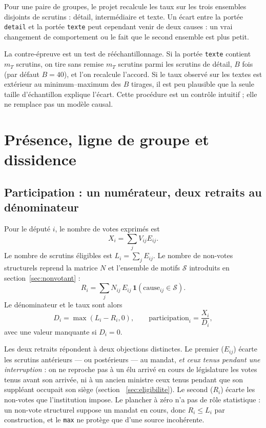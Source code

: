 \documentclass[11pt,a4paper]{article}
\newcommand{\ind}{\mathbf{1}}
\newcommand{\code}[1]{\texttt{#1}}
\begin{document}
Pour une paire de groupes, le projet recalcule les taux sur les trois ensembles
disjoints de scrutins : détail, intermédiaire et texte. Un écart entre la portée
\code{detail} et la portée \code{texte} peut cependant venir de deux causes :
un vrai changement de comportement ou le fait que le second ensemble est plus
petit.

La contre-épreuve est un test de rééchantillonnage. Si la portée \code{texte}
contient $m_T$ scrutins, on tire sans remise $m_T$ scrutins parmi les scrutins de
détail, $B$ fois (par défaut $B=40$), et l'on recalcule l'accord. Si le taux
observé sur les textes est extérieur au minimum--maximum des $B$ tirages, il est
peu plausible que la seule taille d'échantillon explique l'écart. Cette procédure
est un contrôle intuitif ; elle ne remplace pas un modèle causal.

\section{Présence, ligne de groupe et dissidence}

\subsection{Participation : un numérateur, deux retraits au dénominateur}
\label{sec:participation}

Pour le député $i$, le nombre de votes exprimés est
\[
 X_i=\sum_j V_{ij}E_{ij}.
\]
Le nombre de scrutins éligibles est $L_i=\sum_jE_{ij}$. Le nombre de non-votes
structurels reprend la matrice $N$ et l'ensemble de motifs $\mathcal S$
introduits en section~\ref{sec:nonvotant} :
\[
 R_i=\sum_j N_{ij}\,E_{ij}\,
 \ind\!\left(\mathrm{cause}_{ij}\in\mathcal S\right).
\]
Le dénominateur et le taux sont alors
\[
 D_i=\max(L_i-R_i,0),
 \qquad \mathrm{participation}_i=\frac{X_i}{D_i},
\]
avec une valeur manquante si $D_i=0$.

Les deux retraits répondent à deux objections distinctes. Le premier ($E_{ij}$)
écarte les scrutins antérieurs — ou postérieurs — au mandat, \emph{et ceux tenus
pendant une interruption} : on ne reproche pas à un élu arrivé en cours de
législature les votes tenus avant son arrivée, ni à un ancien ministre ceux
tenus pendant que son suppléant occupait son siège (section~
\ref{sec:eligibilite}). Le second ($R_i$) écarte les non-votes que
l'institution impose. Le plancher à zéro
n'a pas de rôle statistique : un non-vote structurel suppose un mandat en cours,
donc $R_i\leq L_i$ par construction, et le \code{max} ne protège que d'une
source incohérente.
\end{document}
